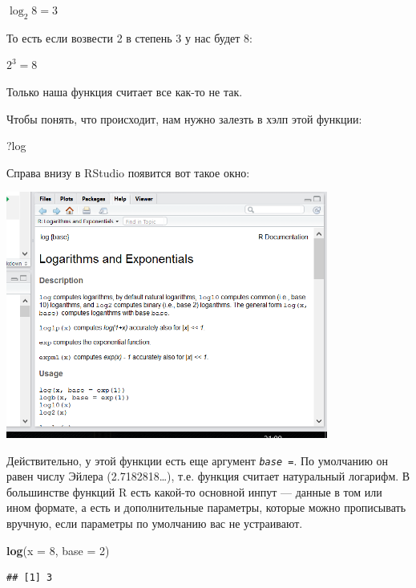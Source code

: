 \documentclass[
]{book}
\newenvironment{Shaded}{\begin{snugshade}}{\end{snugshade}}
\newcommand{\DataTypeTok}[1]{\textcolor[rgb]{0.13,0.29,0.53}{#1}}
\newcommand{\DecValTok}[1]{\textcolor[rgb]{0.00,0.00,0.81}{#1}}
\newcommand{\KeywordTok}[1]{\textcolor[rgb]{0.13,0.29,0.53}{\textbf{#1}}}
\newcommand{\NormalTok}[1]{#1}
\begin{document}
\(\log_2 8 = 3\)

То есть если возвести 2 в степень 3 у нас будет 8:

\(2^3 = 8\)

Только наша функция считает все как-то не так.

Чтобы понять, что происходит, нам нужно залезть в хэлп этой функции:

\begin{Shaded}
\begin{Highlighting}[]
\NormalTok{?log}
\end{Highlighting}
\end{Shaded}

Справа внизу в RStudio появится вот такое окно:

\includegraphics[width=4.16667in,height=\textheight]{images/help.png}

Действительно, у этой функции есть еще аргумент \emph{\texttt{base\ =}}. По умолчанию он равен числу Эйлера (2.7182818\ldots), т.е. функция считает натуральный логарифм.
В большинстве функций R есть какой-то основной инпут --- данные в том или ином формате, а есть и дополнительные параметры, которые можно прописывать вручную, если параметры по умолчанию вас не устраивают.

\begin{Shaded}
\begin{Highlighting}[]
\KeywordTok{log}\NormalTok{(}\DataTypeTok{x =} \DecValTok{8}\NormalTok{, }\DataTypeTok{base =} \DecValTok{2}\NormalTok{)}
\end{Highlighting}
\end{Shaded}

\begin{verbatim}
## [1] 3
\end{verbatim}
\end{document}

